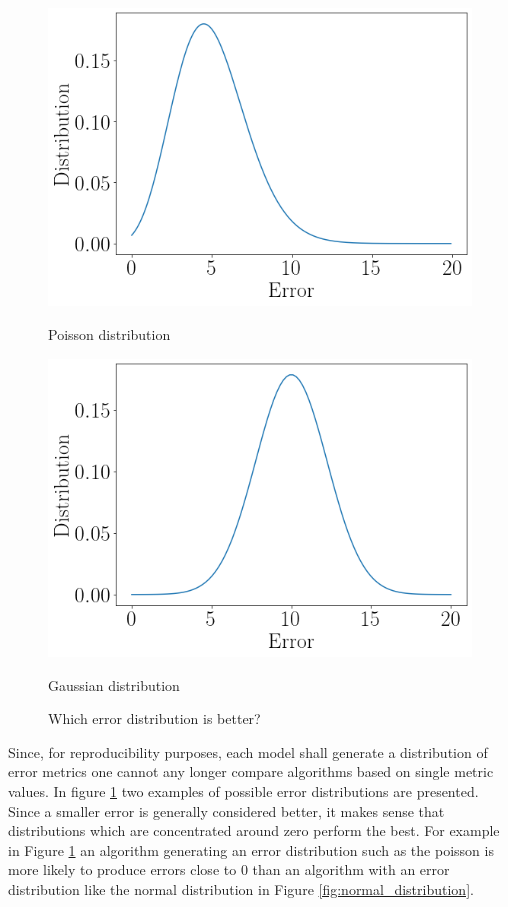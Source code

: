 \begin{figure}[htb]
  \centering
  \includegraphics[width=\linewidth]{./img/poisson_distribution.png}
  \caption{Poisson distribution}
  \label{fig:poisson_distribution}
  \endminipage\hfill
  \includegraphics[width=\linewidth]{./img/normal_distribution.png}
  \caption{Gaussian distribution}
  \label{fig:normal_distribution}
  \endminipage\hfill
  \caption{Which error distribution is better?}
  \label{fig:example_distributions}
\end{figure}


Since, for reproducibility purposes, each model shall generate a distribution of error metrics one cannot any longer compare algorithms based on single metric values. In figure \ref{fig:example_distributions} two examples of possible error distributions are presented. Since a smaller error is generally considered better, it makes sense that distributions which are concentrated around zero perform the best. For example in Figure \ref{fig:example_distributions} an algorithm generating an error distribution such as the poisson is more likely to produce errors close to 0 than an algorithm with an error distribution like the normal distribution in Figure \ref{fig:normal_distribution}.

